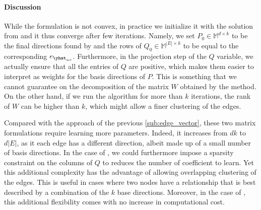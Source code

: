 \paragraph{Discussion}

While the \pqt{} formulation is not convex, in practice we initialize it with the solution from
\combined{} and it thus converge after few iterations. Namely, we set $P_0 \in \mathbb{M}^{d\times
k}$ to be the final directions found by \combined{} and the rows of $Q_0 \in \mathbb{M}^{|E|\times
k}$ to be equal to the corresponding $e_{\yhat_{uv}}$. Furthermore, in the projection
step of the $Q$ variable, we actually ensure that all the entries of $Q$ are positive, which makes
them easier to  interpret as weights for the basis directions of $P$. This is something that we
cannot guarantee on the decomposition of the matrix $W$ obtained by the \fwa{} method. On the other
hand, if we run the \fwa{} algorithm for more than $k$ iterations, the rank of $W$ can be higher
than $k$, which might allow a finer clustering of the edges.

Compared with the \combined{} approach of the previous \autoref{sub:edge_vector}, these two matrix
formulations require learning more parameters. Indeed, it increases from $dk$ to $d|E|$, as it each
edge has a different direction, albeit made up of a small number of basis directions. In the case of
\pqt{}, we could furthermore impose a sparsity constraint on the columns of $Q$ to reduces the
number of coefficient to learn. Yet this additional complexity has the advantage of allowing
overlapping clustering of the edges. This is useful in cases where two nodes have a relationship
that is best described by a combination of the $k$ base directions. Moreover, in the case of \fwa{},
this additional flexibility comes with no increase in computational cost.
